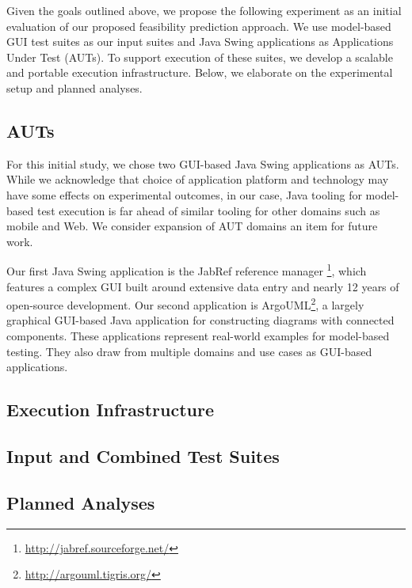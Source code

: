 Given the goals outlined above, we propose the following experiment as an
initial evaluation of our proposed feasibility prediction approach. We use
model-based GUI test suites as our input suites and Java Swing applications as
Applications Under Test (AUTs). To support execution of these suites, we
develop a scalable and portable execution infrastructure. Below, we elaborate
on the experimental setup and planned analyses.

\subsection{AUTs}

For this initial study, we chose two GUI-based Java Swing applications as
AUTs. While we acknowledge that choice of application platform and technology
may have some effects on experimental outcomes, in our case, Java tooling
for model-based test execution is far ahead of similar tooling for other
domains such as mobile and Web. We consider expansion of AUT domains an item
for future work.

Our first Java Swing application is the JabRef reference manager
\footnote{\url{http://jabref.sourceforge.net/}}, which features a complex
GUI built around extensive data entry and nearly 12 years of
open-source development. Our second application is
ArgoUML\footnote{\url{http://argouml.tigris.org/}}, a largely graphical
GUI-based Java application for constructing diagrams with connected
components. These applications represent real-world examples for model-based
testing. They also draw from multiple domains and use cases as GUI-based
applications.

\subsection{Execution Infrastructure}

\subsection{Input and Combined Test Suites}

\subsection{Planned Analyses}
